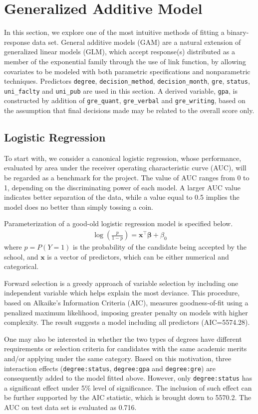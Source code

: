 \section{Generalized Additive Model}
In this section, we explore one of the most intuitive methods of fitting a binary-response data set. General additive models (GAM) are a natural extension of generalized linear models (GLM), which accept response(s) distributed as a member of the exponential family through the use of link function, by allowing covariates to be modeled with both parametric specifications and nonparametric techniques. Predictors \texttt{degree}, \texttt{decision\_method}, \texttt{decision\_month}, \texttt{gre}, \texttt{status}, \texttt{uni\_faclty} and \texttt{uni\_pub} are used in this section. A derived variable, \texttt{gpa}, is constructed by addition of \texttt{gre\_quant}, \texttt{gre\_verbal} and \texttt{gre\_writing}, based on the assumption that final decisions made may be related to the overall score only.
\subsection{Logistic Regression}
To start with, we consider a canonical logistic regression, whose performance, evaluated by area under the receiver operating characteristic curve (AUC), will be regarded as a benchmark for the project. The value of AUC ranges from 0 to 1, depending on the discriminating power of each model. A larger AUC value indicates better separation of the data, while a value equal to 0.5 implies the model does no better than simply tossing a coin.
\par Parameterization of a good-old logistic regression model is specified below.
\begin{align}
\log\left(\frac{p}{1-p}\right)=\mathbf{x}^\top\boldsymbol{\beta}+\beta_0
\end{align}
where $p=P(Y=1)$ is the probability of the candidate being accepted by the school, and $\mathbf{x}$ is a vector of predictors, which can be either numerical and categorical. 
\par Forward selection is a greedy approach of variable selection by including one independent variable which helps explain the most deviance. This procedure, based on Alkaike's Information Criteria (AIC), measures goodness-of-fit using a penalized maximum likelihood, imposing greater penalty on models with higher complexity. The result suggests a model including all predictors (AIC=5574.28).
\par One may also be interested in whether the two types of degrees have different requirements or selection criteria for candidates with the same academic merits and/or applying under the same category. Based on this motivation, three interaction effects (\texttt{degree:status}, \texttt{degree:gpa} and \texttt{degree:gre}) are consequently added to the model fitted above. However, only \texttt{degree:status} has a significant effect under 5\% level of significance. The inclusion of such effect can be further supported by the AIC statistic, which is brought down to 5570.2. The AUC on test data set is evaluated as 0.716.

